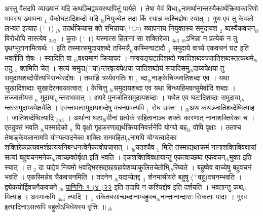 \documentclass[article,12pt,a4paper]{memoir}%
\newcommand{\add}[1]{($^{+}$#1)}
\newcounter{parCount}
\begin{document}
	  
	  \pstart \leavevmode%
	\hphantom{.}अस्तु वैतदपि व्याख्यानं यदि कथञ्चिद्व्यवस्थापितुं पार्यते । {\color{DodgerBlue3}तेषा} मेवं विधा{\tiny $_{lb}$}नामर्थानान्तस्यैकार्थक्रियाकारिणो भावस्य ख्यापना {\tiny $_{1}$} यैकोघटादिशब्दो यदि {\tiny $_{lb}$}नियुज्येत तदा किं स्यान्न कश्चिद्दोषः स्यात् । गुण एव तु केवलो लभ्यत इत्याह \add{।} {\tiny $_{lb}$} {\color{DodgerBlue3}तदर्थक्रियास} {\color{DodgerBlue3}क्ते} रभिन्नाया\add{ः} ख्यापनाय {\color{DodgerBlue3}नियुक्तस्य समुदायश {\tiny $_{2}$} ब्दस्यैकवचन{\tiny $_{lb}$}विरोधोपि नास्त्येव} {\tiny $_{3a2}$} । कुतः \add{।} यस्मात्स {\color{DodgerBlue3}हितानां सा शक्तिरेका} {\tiny $_{3a3}$} {\tiny $_{lb}$}ऽभिन्ना न प्रत्येकं न तु पृथग्भूतानामित्यर्थः । इति तस्मात्समुदायशब्दे तस्मिन्नै{\tiny $_{lb}$}कस्मिन्घटादौ {\tiny $_{3}$} समुदाये वाच्ये एकवचनं घट इति भवतीति शेषः । स्यादिति वा {\tiny $_{lb}$}वक्ष्यमाणं क्रियापदं । नन्वयङ्घटादिशब्दो गवादिशब्दवज्जातिशब्दस्तत्कथमे{\tiny $_{lb}$}तदु {\tiny $_{4}$} क्तमिति चेत् । सत्यं समुदा\add{या}न्तरवृत्यपेक्षया जातिशब्दोयं रूपादिसमु{\tiny $_{lb}$}दाय्यपेक्षया तु समुदायशब्दोपीत्यभिसन्धेरदोषः । तथाहि त्रय्येवगतिः श {\tiny $_{5}$} ब्दा{\tiny $_{lb}$}नाङ्केचिज्जातिशब्दा एव । यथा सुखादिशब्दाः सुखादेरनवयवत्वात् । केचित्तु {\tiny $_{lb}$}समुदायशब्दा एव यथा {\color{DodgerBlue3}विन्ध्यहिमवत्सुमेर्वादि} शब्दाः । तज्जातीयस {\tiny $_{6}$} मुदाया{\tiny $_{lb}$}न्तराभावात् । अपरे पुनर्जातिसमुदायशब्दाः । यथैत एव घटादिशब्दाः समुदाया{\tiny $_{lb}$}न्तरसमुदाय्यपेक्षयेति । एवन्तावत्समुदायशब्देषु वचनप्रवत्यवि {\tiny $_{7}$} रोध उक्तः । {\tiny $_{lb}$}अथ कथञ्जातिशब्देष्वित्याह । {\color{DodgerBlue3}जातिशब्देष्वित्यादि} {\tiny $_{3a3}$} । अर्थानां घटा{\tiny $_{lb}$}वीनां प्रत्येकं सहितानाञ्च शक्तेः कारणात् नानाशक्तिरेका च । एतदुक्तं भवति {\tiny $_{lb}$}यस्मादेको {\tiny $_{8}$} \leavevmode{} पि वृक्षो गृहकरणाद्यर्थक्रियानिवर्त्तनेपि योग्यो बह{\tiny $_{lb}$} \leavevmode{} वोपि वृक्षाः । ततश्च तेषाङ्केवलानामपि योग्यत्वादनेका शक्तिः समवहिता{\tiny $_{lb}$}नामपि योग्यत्वादेका शक्तिरेकप्रत्यवमर्शप्रत्ययनिबन्धनत्वेनैकत्वोपचारात् । {\tiny $_{lb}$}यतश्चैव {\tiny $_{1}$} मिति तस्माद्यथाक्रमं नानाशक्तिविवक्षायां सत्यां बहुवचनमनेक{\tiny $_{lb}$}त्वाच्छक्तेर्वृक्षा इति भवति । एकशक्तिविवक्षायान्तु एकत्वाच्छब्द एकवचन{\tiny $_{lb}$}मुक्त इति स्यात् । त {\tiny $_{2}$} दा यद्येष नियमो भवद्भिरसद्ग्रहग्रहावेशव्याकुलितचेतोभि{\tiny $_{lb}$}रिष्यते । बहुष्वेव वाच्येषु बहुवचनं भवति । एकस्मिन्नेव चैकवचनमिति । तदनेन {\tiny $_{lb}$}यदाप्येतद्द {\tiny $_{3}$} र्शनमाश्रीयते बहुषु \add{वहु}वचनम्भवति । {\color{DodgerBlue3}द्व्येकयोर्द्विवचनैकवचने} {\tiny $_{lb}$} \href{http://sarit.indology.info/?cref=P\%C4\%81.1.4.22}{पाणिनिः १।४।२२} इति तदापि न कश्चिद्दोष इति दर्शयति । भवतान्तु कथ{\tiny $_{lb}$}मित्याह । {\color{DodgerBlue3}अस्माकमि} {\tiny $_{3a4}$} त्यादि । {\tiny $_{4}$} संकेतबसाच्छब्दानाम्बहुवच{\tiny $_{lb}$}नान्तानान्दाराः सिकताः पादाः । गुरव इत्यादिनाऽसत्यपि बहुत्वेऽभिधेयस्य वृत्तिः ॥
	{}
	\pend%
      {\tiny $_{lb}$}
\end{document}
